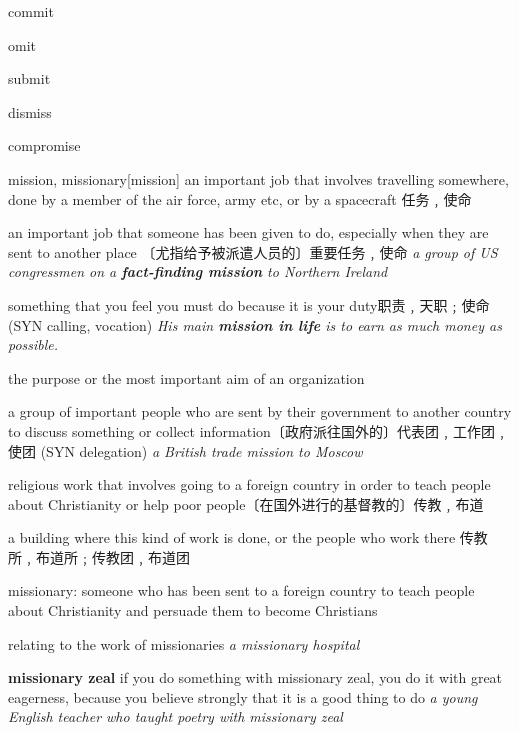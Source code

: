 \begin{DefWord}{commit}
\end{DefWord}

\begin{DefWord}{omit}
\end{DefWord}

\begin{DefWord}{submit}
\end{DefWord}

\begin{DefWord}{dismiss}
\end{DefWord}

\begin{DefWord}{compromise}
\end{DefWord}

\begin{DefWord}{mission, missionary}[mission]
    an important job that involves travelling somewhere, done by a member of the air force, army etc, or by a spacecraft 任务﹐使命

    an important job that someone has been given to do, especially when they are sent to another place 〔尤指给予被派遣人员的〕重要任务﹐使命
    \textit{a group of US congressmen on a \textbf{fact-finding mission} to Northern Ireland}

    something that you feel you must do because it is your duty职责﹐天职﹔使命 (SYN  calling, vocation)
    \textit{His main \textbf{mission in life} is to earn as much money as possible.}

    the purpose or the most important aim of an organization

    a group of important people who are sent by their government to another country to discuss something or collect information〔政府派往国外的〕代表团﹐工作团﹐使团 (SYN  delegation)
    \textit{a British trade mission to Moscow}

    religious work that involves going to a foreign country in order to teach people about Christianity or help poor people〔在国外进行的基督教的〕传教﹐布道

    a building where this kind of work is done, or the people who work there 传教所﹐布道所﹔传教团﹐布道团

    missionary: someone who has been sent to a foreign country to teach people about Christianity and persuade them to become Christians

    relating to the work of missionaries
    \textit{a missionary hospital}

    \textbf{missionary zeal} if you do something with missionary zeal, you do it with great eagerness, because you believe strongly that it is a good thing to do
    \textit{a young English teacher who taught poetry with missionary zeal}
\end{DefWord}

